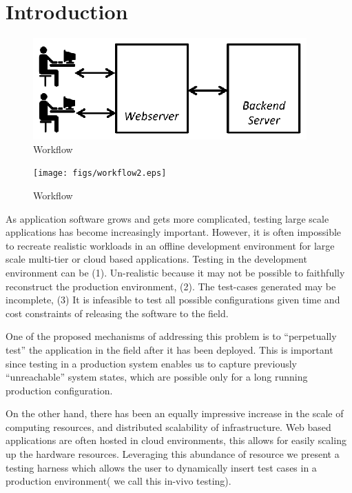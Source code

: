 
\section{Introduction}
\label{sec:intro}

\begin{figure}[t]
  \begin{center}
    \includegraphics[width=0.95\columnwidth]{figs/workflow.eps}
    \caption{Workflow}
    \label{fig:Normal workflow for most multi-tier service oriented systems}
  \end{center}
\end{figure}

\begin{figure}[t]
  \begin{center}
    \texttt{[image: figs/workflow2.eps]}
    \caption{Workflow}
    \label{fig:Backend wrapped around with Parakishan Run-time}
  \end{center}
\end{figure}

As application software grows and gets more complicated, testing large scale applications has become increasingly important. 
However, it is often impossible to recreate realistic workloads in an offline development environment for large scale multi-tier or cloud based applications.
Testing in the development environment can be (1). Un-realistic because it may not be possible to faithfully reconstruct the production environment, (2). The test-cases generated may be incomplete, (3) It is infeasible to test all possible configurations given time and cost constraints of releasing the software to the field. 

One of the proposed mechanisms of addressing this problem is to ``perpetually test'' the application in the field after it has been deployed. 
This is important since testing in a production system enables us to capture previously ``unreachable'' system states, which are possible only for a long running production configuration.


On the other hand, there has been an equally impressive increase in the scale of computing resources, and distributed scalability of infrastructure.
Web based applications are often hosted in cloud environments, this allows for easily scaling up the hardware resources.
Leveraging this abundance of resource we present a testing harness which allows the user to dynamically insert test cases in a production environment( we call this in-vivo testing).

